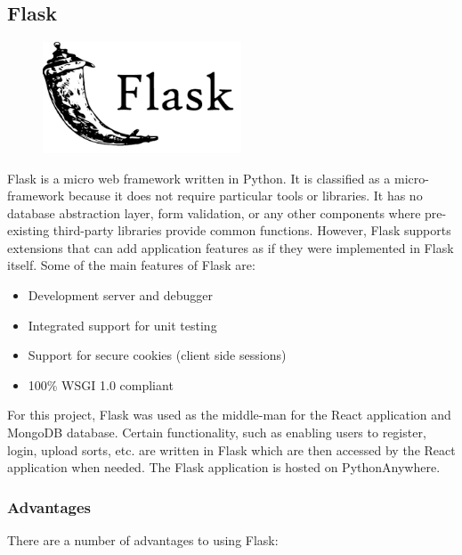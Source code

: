 \newpage
\subsection{Flask}
\par
\medskip
\begin{center}
    \includegraphics[width=8cm,height=3.3cm,keepaspectratio]{images/flask}
\end{center}
Flask is a micro web framework written in Python. It is classified as a 
micro-framework because it does not require particular tools or libraries. It 
has no database abstraction layer, form validation, or any other components 
where pre-existing third-party libraries provide common functions. However, 
Flask supports extensions that can add application features as if they were 
implemented in Flask itself. Some of the main features of Flask are:

\begin{itemize}
    \item Development server and debugger
    \item Integrated support for unit testing
    \item Support for secure cookies (client side sessions)
    \item 100\% WSGI 1.0 compliant
\end{itemize}

For this project, Flask was used as the middle-man for the React application and
MongoDB database. Certain functionality, such as enabling users to register, 
login, upload sorts, etc. are written in Flask which are then accessed by the 
React application when needed. The Flask application is hosted on 
PythonAnywhere.

\subsubsection{Advantages}
There are a number of advantages to using Flask:


